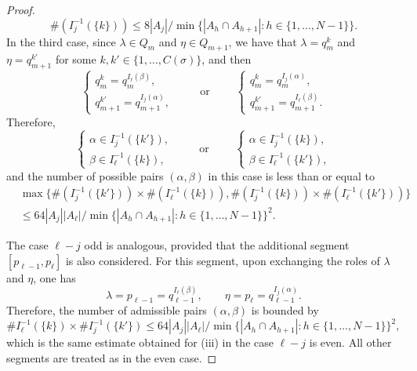 \documentclass{article}
\theoremstyle{plain}
\theoremstyle{definition}
\newcommand{\s}{\sigma}
\numberwithin{equation}{section}
\begin{document}
\begin{proof}
\begin{equation*}
    \#(I_j^{-1}(\{k\})) \leq  8|A_j|/\min\{|A_h\cap A_{h+1}| :  h\in\{1,\dots, N-1\}\}.
\end{equation*}
In the third case, since $\lambda\in Q_m$ and $\eta\in Q_{m+1}$, we have that $\lambda=q_m^k$ and $\eta=q_{m+1}^{k'}$ for some $k,k'\in\{1,\dots, C(\s)\}$, and then
\begin{equation*}
  \begin{cases}
      q_m^k=q_m^{I_\ell(\beta)}, \\[3pt]
      q_{m+1}^{k'}=q_{m+1}^{I_j(\alpha)},
  \end{cases}\qquad \text{ or } \qquad  
  \begin{cases}
q_m^k=q_{m}^{I_j(\alpha)}, \\[3pt]
q_{m+1}^{k'}=q_{m+1}^{I_\ell(\beta)}.
  \end{cases}
\end{equation*}
Therefore,
\begin{equation*}
\begin{cases}
   \alpha\in I_j^{-1}(\{k'\}), \\
   \beta \in I_\ell^{-1}(\{k\}), 
\end{cases}
    \qquad \text{ or } \qquad
    \begin{cases}
        \alpha\in I_j^{-1}(\{k\}),\\ \beta \in I_\ell^{-1}(\{k'\}),
    \end{cases} 
\end{equation*}
and the number of possible pairs $(\alpha,\beta)$ in this case is less than or equal to 
\begin{align*}
   & \max\{\#(I_j^{-1}(\{k'\}))\times \#(I_\ell^{-1}(\{k\})), \#(I_j^{-1}(\{k\}))\times \#(I_\ell^{-1}(\{k'\}))\} \\ &\leq64|A_j||A_\ell|/\min\{|A_h\cap A_{h+1}| :  h\in\{1,\dots, N-1\}\}^2.
\end{align*}

The case $\ell-j$ odd is analogous, provided that the additional segment $[p_{\ell-1},p_\ell]$ is also considered.
For this segment, upon exchanging the roles of $\lambda$ and $\eta$, one has
\[
\lambda=p_{\ell-1}=q_{\ell-1}^{I_\ell(\beta)},\qquad
\eta=p_\ell=q_{\ell-1}^{I_j(\alpha)}.
\]
Therefore, the number of admissible pairs $(\alpha,\beta)$ is bounded by
\[
\#I_\ell^{-1}(\{k\})\times\# I_j^{-1}(\{k'\})
\leq
64|A_j||A_\ell|/
\min\{|A_h\cap A_{h+1}|:h \in \{1,\dots,N-1\}\}^2,
\]
which is the same estimate obtained for (iii) in the case $\ell-j$ is even. All other segments are treated as in the even case.


\end{proof}
\end{document}
